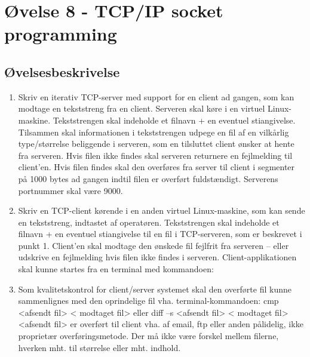 \section{Øvelse 8 - TCP/IP socket programming}

\subsection{Øvelsesbeskrivelse}

\begin{enumerate}
	\item Skriv en iterativ TCP-server med support for en client ad gangen, som kan modtage	en tekststreng fra en client. Serveren skal køre i en virtuel Linux-maskine.
	Tekststrengen skal indeholde et filnavn + en eventuel stiangivelse. Tilsammen skal informationen i tekststrengen udpege en fil af en vilkårlig type/størrelse beliggende i
	serveren, som en tilsluttet client ønsker at hente fra serveren. Hvis filen ikke findes	skal serveren returnere en fejlmelding til client’en. Hvis filen findes skal den overføres
	fra server til client i segmenter på 1000 bytes ad gangen indtil filen er overført fuldstændigt. Serverens portnummer skal være 9000.
	\item Skriv en TCP-client kørende i en anden virtuel Linux-maskine, som kan sende en tekststreng, indtastet af operatøren. Tekststrengen skal indeholde et filnavn + en
	eventuel stiangivelse til en fil i TCP-serveren, som er beskrevet i punkt 1. Client’en skal modtage den ønskede fil fejlfrit fra serveren – eller udskrive en fejlmelding hvis
	filen ikke findes i serveren. Client-applikationen skal kunne startes fra en terminal med kommandoen:
	\item Som kvalitetskontrol for client/server systemet skal den overførte fil kunne sammenlignes med den oprindelige fil vha. terminal-kommandoen:
	cmp <afsendt fil> < modtaget fil> 
	eller
	diff –s <afsendt fil> < modtaget fil>
	<afsendt fil> er overført til client vha. af email, ftp eller anden pålidelig, ikke	proprietær overføringsmetode.
	Der må ikke være forskel mellem filerne, hverken mht. til størrelse eller mht. indhold.
\end{enumerate}

